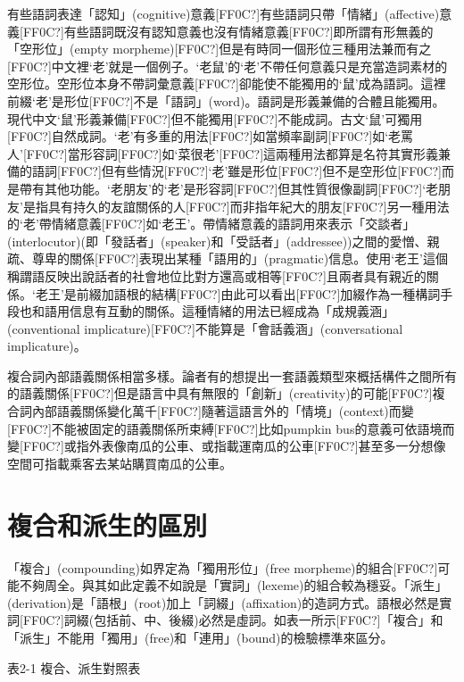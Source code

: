 \textrm{有些語詞表達「認知」(cognitive)意義[FF0C?]有些語詞只帶「情緒」(affective)意義[FF0C?]有些語詞既沒有認知意義也沒有情緒意義[FF0C?]即所謂有形無義的「空形位」(empty morpheme)[FF0C?]但是有時同一個形位三種用法兼而有之[FF0C?]中文裡‘老’就是一個例子。‘老鼠’的‘老’不帶任何意義只是充當造詞素材的空形位。空形位本身不帶詞彙意義[FF0C?]卻能使不能獨用的‘鼠’成為語詞。這裡前綴‘老’是形位[FF0C?]不是「語詞」(word)。語詞是形義兼備的合體且能獨用。現代中文‘鼠’形義兼備[FF0C?]但不能獨用[FF0C?]不能成詞。古文‘鼠’可獨用[FF0C?]自然成詞。‘老’有多重的用法[FF0C?]如當頻率副詞[FF0C?]如‘老罵人’}[FF0C?]\textrm{當形容詞[FF0C?]如‘菜很老’}[FF0C?]\textrm{這兩種用法都算是名符其實形義兼備的語詞[FF0C?]但有些情況[FF0C?]‘老’雖是形位[FF0C?]但不是空形位[FF0C?]而是帶有其他功能。‘老朋友’的‘老’是形容詞[FF0C?]但其性質很像副詞[FF0C?]‘老朋友’是指具有持久的友誼關係的人[FF0C?]而非指年紀大的朋友[FF0C?]另一種用法的‘老’帶情緒意義[FF0C?]如‘老王’}。\textrm{帶情緒意義的語詞用來表示「交談者」(interlocutor)(即「發話者」(speaker)和「受話者」(addressee))之間的愛憎、親疏、尊卑的關係[FF0C?]表現出某種「語用的」(pragmatic)信息。使用‘老王’這個稱謂語反映出說話者的社會地位比對方還高或相等[FF0C?]且兩者具有親近的關係。‘老王’是前綴加語根的結構[FF0C?]由此可以看出[FF0C?]加綴作為一種構詞手段也和語用信息有互動的關係。這種情緒的用法已經成為「成規義涵」(conventional implicature)[FF0C?]不能算是「會話義涵」(conversational implicature)。}

\textrm{複合詞內部語義關係相當多樣。論者有的想提出一套語義類型來概括構件之間所有的語義關係[FF0C?]但是語言中具有無限的「創新」(creativity)的可能[FF0C?]複合詞內部語義關係變化萬千[FF0C?]隨著這語言外的「情境」(context)而變[FF0C?]不能被固定的語義關係所束縛[FF0C?]比如pumpkin bus的意義可依語境而變[FF0C?]或指外表像南瓜的公車、或指載運南瓜的公車[FF0C?]甚至多一分想像空間可指載乘客去某站購買南瓜的公車。}

\section{\rmfamily 複合和派生的區別}

\textrm{「複合」(compounding)如界定為「獨用形位」(free morpheme)的組合[FF0C?]可能不夠周全。與其如此定義不如說是「實詞」(lexeme)的組合較為穩妥。「派生」(derivation)是「語根」(root)加上「詞綴」(affixation)的造詞方式。語根必然是實詞[FF0C?]詞綴(包括前、中、後綴)必然是虛詞。如表一所示[FF0C?]「複合」和「派生」不能用「獨用」(free)和「連用」(bound)的檢驗標準來區分。}

\textrm{表2-1 複合、}派生對照表

\tablefirsthead{}


